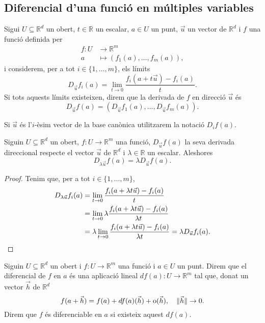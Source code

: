 \documentclass[../Apunts.tex]{subfiles}
\begin{document}
	\subsection{Diferencial d'una funció en múltiples variables}
	\begin{definition}
		\label{def:derivada direccional}
		Sigui \(U\subseteq\mathbb{R}^{d}\) un obert, \(t\in\mathbb{R}\) un escalar, \(a\in U\) un punt, \(\vec{u}\) un vector de \(\mathbb{R}^{d}\) i \(f\) una funció definida per
		\begin{align*}
		f\colon U&\longrightarrow\mathbb{R}^{m}\\
		a&\longmapsto(f_{1}(a),\dots,f_{m}(a)),
		\end{align*}
		i considerem, per a tot \(i\in\{1,\dots,m\}\), els límits
		\[D_{\vec{u}}f_{i}(a)=\lim_{t\to0}\frac{f_{i}(a+t\vec{u})-f_{i}(a)}{t}.\]
		Si tots aquests límits existeixen, direm que la derivada de \(f\) en direcció \(\vec{u}\) és
		\[D_{\vec{u}}f(a)=\left(D_{\vec{u}}f_{1}(a),\dots,D_{\vec{u}}f_{m}(a)\right).\]
		
		Si \(\vec{u}\) és l'\(i\)-èsim vector de la base canònica utilitzarem la notació \(D_{i}f(a)\).
	\end{definition}
	\begin{proposition}\label{prop:derivades direccionals lineals pel producte d'escalars}
		Siguin \(U\subseteq\mathbb{R}^{d}\) un obert, \(f\colon U\to\mathbb{R}^{m}\) una funció, \(D_{\vec{u}}f(a)\) la seva derivada direccional respecte el vector \(\vec{u}\) de \(\mathbb{R}^d\) i \(\lambda\in\mathbb{R}\) un escalar. Aleshores
		\[D_{\lambda\vec{u}}f(a)=\lambda D_{\vec{u}}f(a).\]
		\begin{proof}
			Tenim que, per a tot \(i\in \{1,\dots,m\}\),
			\begin{align*}
			D_{\lambda\vec{u}}f_{i}(a)&=\lim_{t\to0}\frac{f_{i}(a+\lambda t\vec{u})-f_{i}(a)}{t}\\
			&=\lim_{t\to0}\lambda\frac{f_{i}(a+\lambda t\vec{u})-f_{i}(a)}{\lambda t}\\
			&=\lambda\lim_{t\to0}\frac{f_{i}(a+\lambda t\vec{u})-f_{i}(a)}{\lambda t}=\lambda D_{\vec{u}}f_{i}(a).\qedhere
			\end{align*}
		\end{proof}
	\end{proposition}
	\begin{definition}
		\label{def:diferencial}
		Siguin \(U\subseteq\mathbb{R}^{d}\) un obert i \(f\colon U\to\mathbb{R}^{m}\) una funció i \(a\in U\) un punt. Direm que el diferencial de \(f\) en \(a\) és una aplicació lineal \(df(a)\colon U\to\mathbb{R}^{m}\) tal que, donat un vector \(\vec{h}\) de \(\mathbb{R}^{d}\)
		\[f(a+\vec{h})=f(a)+df(a)(\vec{h})+\operatorname{o}(\vec{h}),\quad\lVert\vec{h}\rVert\to0.\]
		Direm que \(f\) és diferenciable en \(a\) si existeix aquest \(df(a)\).
	\end{definition}
\end{document}
